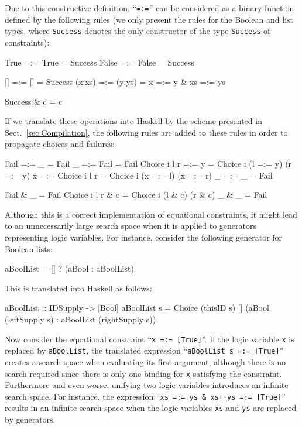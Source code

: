 \documentclass{llncs}
\newcommand{\code}[1]{\mbox{\small\texttt{#1}}}
\newcommand{\ccode}[1]{``\code{#1}''}
\begin{document}
Due to this constructive definition, \ccode{=:=}
can be considered as a binary function defined by the
following rules (we only present the rules for the Boolean
and list types, where \code{Success} denotes the only constructor
of the type \code{Success} of constraints):
\begin{curry}
  True   =:= True    =  Success
  False  =:= False   =  Success

  []     =:= []      =  Success
  (x:xs) =:= (y:ys)  =  x =:= y & xs =:= ys

  Success & c  =  c
\end{curry}
%
If we translate these operations into Haskell by the scheme
presented in Sect.~\ref{sec:Compilation},
the following rules are added to these rules
in order to propagate choices and failures:
\begin{haskell}
  Fail         =:= _             =  Fail
  _            =:= Fail          =  Fail
  Choice i l r =:= y             =  Choice i (l =:= y) (r =:= y)
  x            =:= Choice i l r  =  Choice i (x =:= l) (x =:= r)
  _            =:= _             =  Fail

  Fail         & _     =  Fail
  Choice i l r & c     =  Choice i (l & c) (r & c)
  _            & _     =  Fail

\end{haskell}
%
Although this is a correct implementation of equational constraints,
it might lead to an unnecessarily large search space
when it is applied to generators representing logic variables.
For instance, consider the following generator for Boolean lists:
\begin{curry}
  aBoolList = [] ? (aBool : aBoolList)
\end{curry}
This is translated into Haskell as follows:
\begin{haskell}
  aBoolList :: IDSupply -> [Bool]
  aBoolList s = Choice (thisID s) [] (aBool (leftSupply s)
                                      : aBoolList (rightSupply s))
\end{haskell}
Now consider the equational constraint \ccode{x =:= [True]}.
If the logic variable \code{x} is replaced by \code{aBoolList},
the translated expression \ccode{aBoolList s =:= [True]}
creates a search space when evaluating its first argument,
although there is no search required since there is only one
binding for \code{x} satisfying the constraint.
Furthermore and even worse, unifying two logic variables
introduces an infinite search space. For instance,
the expression \ccode{xs =:= ys \& xs++ys =:= [True]}
results in an infinite search space when the logic variables
\code{xs} and \code{ys} are replaced by generators.
\end{document}
